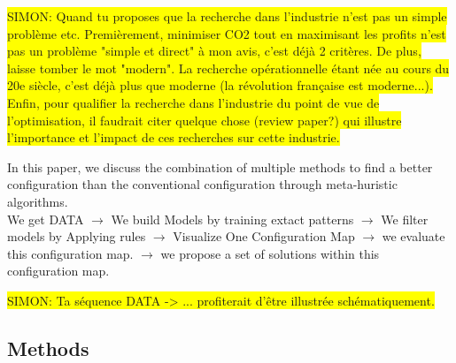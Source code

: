 \documentclass[12pt]{article}
\newcommand{\h}[1]{\colorbox{yellow}{#1}}
\begin{document}
\h{SIMON: Quand tu proposes que la recherche dans l'industrie n'est pas un simple problème etc. Premièrement, minimiser CO2 tout en maximisant les profits n'est pas un problème "simple et direct" à mon avis, c'est déjà 2 critères. De plus, laisse tomber le mot "modern". La recherche opérationnelle étant née au cours du 20e siècle, c'est déjà plus que moderne (la révolution française est moderne...). Enfin, pour qualifier la recherche dans l'industrie du point de vue de l'optimisation, il faudrait citer quelque chose (review paper?) qui illustre l'importance et l'impact de ces recherches sur cette industrie.}


In this paper, we discuss the combination of multiple methods to find a better configuration than the conventional configuration through meta-huristic algorithms. \\

We get DATA $\rightarrow$ We build Models by training extact patterns $\rightarrow$ We filter models by Applying rules $\rightarrow$ Visualize One Configuration Map $\rightarrow$ we evaluate this configuration map.  $\rightarrow$ we propose a set of solutions within this configuration map. 

\h{SIMON: Ta séquence DATA -> ... profiterait d'être illustrée schématiquement.}

\subsection{Methods}
\end{document}
